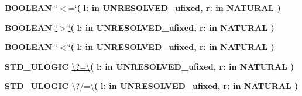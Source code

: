 \begin{DoxyCompactItemize}
\item 
{\bfseries {\bfseries \textcolor{comment}{B\+O\+O\+L\+E\+A\+N}\textcolor{vhdlchar}{ }}} \hyperlink{class__fixed__pkg_a65b73a94d4fe541a941f431175b342b7}{\char`\"{}$<$=\char`\"{}}{\bfseries  ( }{\bfseries \textcolor{vhdlchar}{l\+: }\textcolor{stringliteral}{in }\textcolor{vhdlchar}{U\+N\+R\+E\+S\+O\+L\+V\+E\+D\+\_\+ufixed}}{\bfseries  , \textcolor{vhdlchar}{r\+: }\textcolor{stringliteral}{in }{\bfseries \textcolor{comment}{N\+A\+T\+U\+R\+A\+L}\textcolor{vhdlchar}{ }}}{\bfseries  )} 
\item 
{\bfseries {\bfseries \textcolor{comment}{B\+O\+O\+L\+E\+A\+N}\textcolor{vhdlchar}{ }}} \hyperlink{class__fixed__pkg_ac6c82329bf849852be997a3d0a737cf9}{\char`\"{}$>$\char`\"{}}{\bfseries  ( }{\bfseries \textcolor{vhdlchar}{l\+: }\textcolor{stringliteral}{in }\textcolor{vhdlchar}{U\+N\+R\+E\+S\+O\+L\+V\+E\+D\+\_\+ufixed}}{\bfseries  , \textcolor{vhdlchar}{r\+: }\textcolor{stringliteral}{in }{\bfseries \textcolor{comment}{N\+A\+T\+U\+R\+A\+L}\textcolor{vhdlchar}{ }}}{\bfseries  )} 
\item 
{\bfseries {\bfseries \textcolor{comment}{B\+O\+O\+L\+E\+A\+N}\textcolor{vhdlchar}{ }}} \hyperlink{class__fixed__pkg_a5d059cf3277e3585e4f3f076db10b273}{\char`\"{}$<$\char`\"{}}{\bfseries  ( }{\bfseries \textcolor{vhdlchar}{l\+: }\textcolor{stringliteral}{in }\textcolor{vhdlchar}{U\+N\+R\+E\+S\+O\+L\+V\+E\+D\+\_\+ufixed}}{\bfseries  , \textcolor{vhdlchar}{r\+: }\textcolor{stringliteral}{in }{\bfseries \textcolor{comment}{N\+A\+T\+U\+R\+A\+L}\textcolor{vhdlchar}{ }}}{\bfseries  )} 
\item 
{\bfseries {\bfseries \textcolor{comment}{S\+T\+D\+\_\+\+U\+L\+O\+G\+I\+C}\textcolor{vhdlchar}{ }}} \hyperlink{class__fixed__pkg_a69151531d87456d952c2073704fa1779}{\textbackslash{}?=\textbackslash{}}{\bfseries  ( }{\bfseries \textcolor{vhdlchar}{l\+: }\textcolor{stringliteral}{in }\textcolor{vhdlchar}{U\+N\+R\+E\+S\+O\+L\+V\+E\+D\+\_\+ufixed}}{\bfseries  , \textcolor{vhdlchar}{r\+: }\textcolor{stringliteral}{in }{\bfseries \textcolor{comment}{N\+A\+T\+U\+R\+A\+L}\textcolor{vhdlchar}{ }}}{\bfseries  )} 
\item 
{\bfseries {\bfseries \textcolor{comment}{S\+T\+D\+\_\+\+U\+L\+O\+G\+I\+C}\textcolor{vhdlchar}{ }}} \hyperlink{class__fixed__pkg_a172a73302b09f0d298b93ecda8c5e976}{\textbackslash{}?/=\textbackslash{}}{\bfseries  ( }{\bfseries \textcolor{vhdlchar}{l\+: }\textcolor{stringliteral}{in }\textcolor{vhdlchar}{U\+N\+R\+E\+S\+O\+L\+V\+E\+D\+\_\+ufixed}}{\bfseries  , \textcolor{vhdlchar}{r\+: }\textcolor{stringliteral}{in }{\bfseries \textcolor{comment}{N\+A\+T\+U\+R\+A\+L}\textcolor{vhdlchar}{ }}}{\bfseries  )} 

\end{DoxyCompactItemize}
